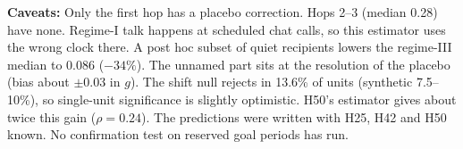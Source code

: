 \textbf{Caveats:} Only the first hop has a placebo correction. Hops 2--3 (median 0.28) have none. Regime-I talk happens at scheduled chat calls, so this estimator uses the wrong clock there. A post hoc subset of quiet recipients lowers the regime-III median to 0.086 ($-34\%$). The unnamed part sits at the resolution of the placebo (bias about $\pm0.03$ in $g$). The shift null rejects in 13.6\% of units (synthetic 7.5--10\%), so single-unit significance is slightly optimistic. H50's estimator gives about twice this gain ($\rho=0.24$). The predictions were written with H25, H42 and H50 known. No confirmation test on reserved goal periods has run.
